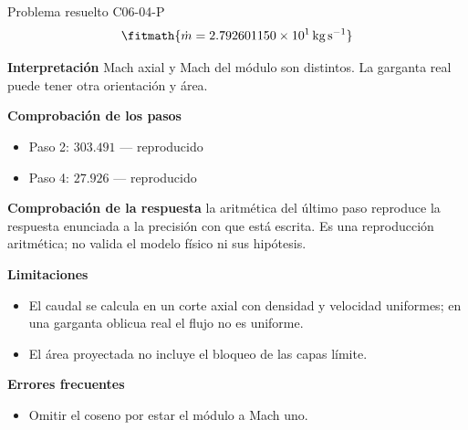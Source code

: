 \documentclass[10pt,openany]{book}
\begin{document}
\begin{studiumworked}{Problema resuelto C06-04-P}
\[
\fitmath{\dot m=2.792601150\times10^{1}\,\mathrm{kg}\,\mathrm{s}^{-1}}
\]

\noindent\textbf{Interpretación}
Mach axial y Mach del módulo son distintos. La garganta real puede tener otra orientación y área.

\noindent\textbf{Comprobación de los pasos}
\begin{itemize}
\item Paso 2: $303.491$ — reproducido
\item Paso 4: $27.926$ — reproducido
\end{itemize}

\noindent\textbf{Comprobación de la respuesta} la aritmética del último paso reproduce la respuesta enunciada a la precisión con que está escrita. Es una reproducción aritmética; no valida el modelo físico ni sus hipótesis.

\noindent\textbf{Limitaciones}
\begin{itemize}
\item El caudal se calcula en un corte axial con densidad y velocidad uniformes; en una garganta oblicua real el flujo no es uniforme.
\item El área proyectada no incluye el bloqueo de las capas límite.
\end{itemize}

\noindent\textbf{Errores frecuentes}
\begin{itemize}
\item Omitir el coseno por estar el módulo a Mach uno.
\end{itemize}
\end{studiumworked}
\end{document}
